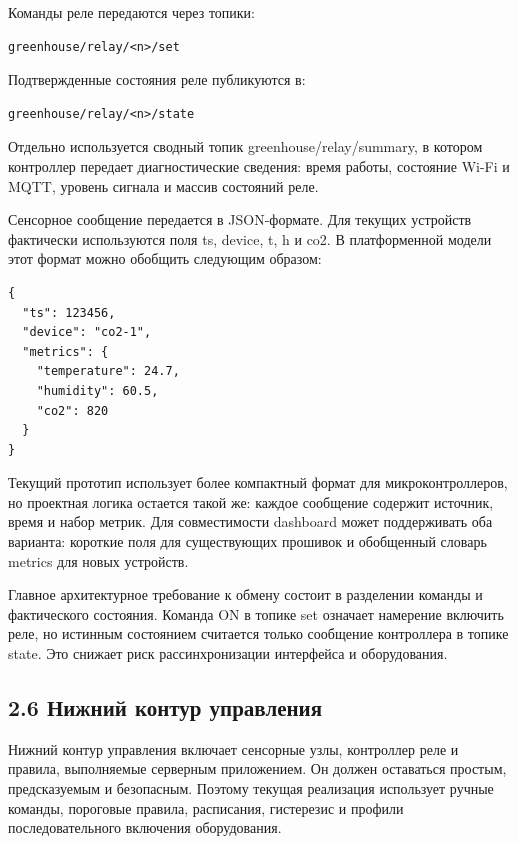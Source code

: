 \documentclass[a4paper,14pt]{extarticle}
\renewcommand{\texttt}[1]{\textnormal{#1}}
\begin{document}
Команды реле передаются через топики:

\begin{verbatim}
greenhouse/relay/<n>/set
\end{verbatim}

Подтвержденные состояния реле публикуются в:

\begin{verbatim}
greenhouse/relay/<n>/state
\end{verbatim}

Отдельно используется сводный топик \texttt{greenhouse/relay/summary}, в
котором контроллер передает диагностические сведения: время работы,
состояние Wi-Fi и MQTT, уровень сигнала и массив состояний реле.

Сенсорное сообщение передается в JSON-формате. Для текущих устройств
фактически используются поля \texttt{ts}, \texttt{device}, \texttt{t},
\texttt{h} и \texttt{co2}. В платформенной модели этот формат можно
обобщить следующим образом:

\begin{verbatim}
{
  "ts": 123456,
  "device": "co2-1",
  "metrics": {
    "temperature": 24.7,
    "humidity": 60.5,
    "co2": 820
  }
}
\end{verbatim}

Текущий прототип использует более компактный формат для
микроконтроллеров, но проектная логика остается такой же: каждое
сообщение содержит источник, время и набор метрик. Для совместимости
dashboard может поддерживать оба варианта: короткие поля для
существующих прошивок и обобщенный словарь \texttt{metrics} для новых
устройств.

Главное архитектурное требование к обмену состоит в разделении команды и
фактического состояния. Команда \texttt{ON} в топике \texttt{set}
означает намерение включить реле, но истинным состоянием считается
только сообщение контроллера в топике \texttt{state}. Это снижает риск
рассинхронизации интерфейса и оборудования.

\subsection{2.6 Нижний контур
управления}\label{ux43dux438ux436ux43dux438ux439-ux43aux43eux43dux442ux443ux440-ux443ux43fux440ux430ux432ux43bux435ux43dux438ux44f}

Нижний контур управления включает сенсорные узлы, контроллер реле и
правила, выполняемые серверным приложением. Он должен оставаться
простым, предсказуемым и безопасным. Поэтому текущая реализация
использует ручные команды, пороговые правила, расписания, гистерезис и
профили последовательного включения оборудования.
\end{document}
